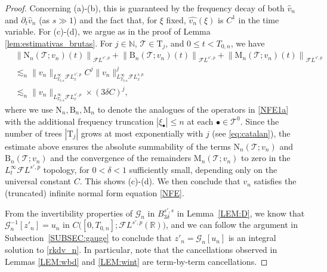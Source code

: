 \documentclass[a4paper,
11pt,  reqno]{amsart}
\newcommand{\5}{\textup{V}}
\newcommand{\FL}{\mathcal{F} L}
\newcommand{\ft}{\widehat}
\newcommand{\les}{\lesssim}
\newcommand{\dl}{\delta}
\newcommand{\dt}{\partial_t}
\theoremstyle{remark}
\newcommand{\R}{\mathbb{R}}
\newcommand{\bul}{\bullet}
\newcommand{\TT}{\mathcal{T}}
\newcommand{\Tr}{\mathrm{T}}
\newcommand{\N}{\mathbb{N}}
\newcommand{\Gc}{\mathcal{G}}
\numberwithin{equation}{section}
\numberwithin{theorem}{section}
\newcommand{\MM}{\mathrm{M}}
\newcommand{\NN}{\mathrm{N}}
\newcommand{\BB}{\mathrm{B}}
\begin{document}
\begin{proof}
Concerning (a)-(b),  this is guaranteed by the frequency decay of both $\widehat{v}_n$ and $\dt \widehat{v}_n$ (as $s\gg 1$) and the fact that, for $\xi$ fixed, $\ft{v_n}(\xi)$ is $C^1$ in the time variable.
For (c)-(d), we argue as in the proof of Lemma \ref{lem:estimativas_brutas}. For $j\in \N$, $\TT\in \Tr_j$, and $0 \le t < T_{0,n}$, we have
\begin{align*}
&
	\left\|\NN_n(\TT;v_n)(t)\right\|_{\FL^{s',p}} + 	\left\|\BB_n(\TT;v_n)(t)\right\|_{\FL^{s',p}} + 	\left\|\MM_n(\TT;v_n)(t)\right\|_{\FL^{s',p}}
\\
&\les_n \|v_n\|_{L^\infty_{T_{0,n}}\FL^{s',p}_x}  C^j  \|v_n\|_{L^\infty_{T_{0,n}}\FL^{s,p}_x}^j
\\
&\les_n \|v_n\|_{L^\infty_{T_{0,n}}\FL^{s',p}_x} \times (3  \delta C )^j,
\end{align*}
where we use $\NN_n, \BB_n,\MM_n$ to denote the analogues of the operators in \eqref{NFE1a} with the additional frequency truncation $|\xi_\bul| \le n$ at each $\bul \in \TT^0$.
Since the number of trees $|\Tr_j|$ grows at most exponentially with $j$ (see \eqref{eq:catalan}), the estimate above ensures the absolute summability of the terms $\NN_n(\TT;v_n)$ and $\BB_n(\TT;v_n)$ and the convergence of the remainders $\MM_n(\TT;v_n)$ to zero in the $L^\infty_t \FL^{s',p}$ topology, for $0< \dl <1$ sufficiently small, depending only on the universal constant $C$. This shows (c)-(d).
We then conclude that $v_n$ satisfies the (truncated) infinite normal form equation \eqref{NFE}.

From the invertibility properties of $\Gc_n$ in $B^{s',s}_{3\dl}$ in Lemma~\ref{LEM:D}, we know that $\Gc_n^{-1} [z'_n] = u_n$ in $C\big([0,T_{0,n}] ; \FL^{s',p}(\R)\big)$, and we can follow the argument in Subsection~\ref{SUBSEC:gauge} to conclude that $z'_n=\Gc_n[u_n]$ is an integral solution to \eqref{rkdv_n}. In particular, note that the cancellations observed in Lemmas \ref{LEM:wbd} and \ref{LEM:wint} are term-by-term cancellations.



\end{proof}
\end{document}
